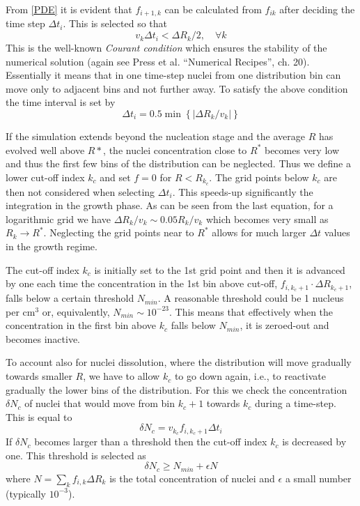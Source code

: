 \documentclass[12pt,a4paper]{article}
\begin{document}
From \eqref{PDE} it is evident that $f_{i+1,k}$ can be calculated from $f_{ik}$ after deciding the time step $\Delta t_i$. This is selected so that
\begin{equation}
v_k  \Delta t_i < \Delta R_k/2, \quad \forall k
\end{equation}
This is the well-known \textit{Courant condition} which ensures the stability of the numerical solution (again see Press et al. ``Numerical Recipes'', ch. 20). Essentially it means that in one time-step nuclei from one distribution bin can move only to adjacent bins and not further away. To satisfy the above condition the time interval is set by
\begin{equation}
\Delta t_i = 0.5 \min \left\lbrace  | \Delta R_k / v_k | \right\rbrace 
\end{equation}

If the simulation extends beyond the nucleation stage and the average $R$ has evolved well above $R*$, the  nuclei concentration close to $R^*$ becomes very low and thus the first few bins of the distribution can be neglected. Thus we define a lower cut-off index $k_c$ and set $f=0$ for $R<R_{k_c}$. The grid points below $k_c$ are then not considered when selecting  $\Delta t_i$. This speeds-up significantly the integration in the growth phase. As can be seen from the last equation, for a logarithmic grid we have  $\Delta R_k / v_k \sim 0.05 R_k / v_k $ which becomes very small as $R_k \to R^*$. Neglecting the grid points near to $R^*$ allows for much larger $\Delta t$ values in the growth regime.

The cut-off index $k_c$ is initially set to the 1st grid point and then it is advanced by one each time the concentration in the 1st bin above cut-off, $f_{i,k_c+1}\cdot \Delta R_{k_c+1}$, falls below a certain threshold $N_{min}$. A reasonable threshold could be 1 nucleus per cm$^3$ or, equivalently, $N_{min}\sim 10^{-23}$. This means that effectively when the concentration in the first bin above $k_c$ falls below $N_{min}$, it is zeroed-out and becomes inactive. 

To account also for nuclei dissolution, where the distribution will move gradually towards smaller $R$, we have to allow $k_c$ to go down again, i.e., to reactivate gradually the lower bins of the distribution. For this we check the concentration $\delta N_c$ of nuclei that would move from bin $k_c+1$ towards $k_c$ during a time-step. This is equal to 
\[
\delta N_c = v_{k_c} f_{i,k_c+1} \Delta t_i
\] 
If $\delta N_c$ becomes larger than a threshold then the cut-off index $k_c$ is decreased by one. This threshold is selected as
\begin{equation}
\delta N_c \geq N_{min} + \epsilon N
\end{equation}
where $N = \sum_k {f_{i,k} \Delta R_k}$ is the total concentration of nuclei and $\epsilon$ a small number (typically $10^{-3}$).










\end{document}
